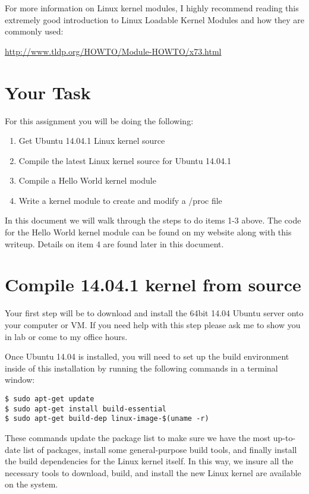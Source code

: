 \documentclass[11pt]{article}
\begin{document}
For more information on Linux kernel modules, I highly recommend reading this extremely good introduction to Linux Loadable Kernel Modules and how they are commonly used:

{\url{http://www.tldp.org/HOWTO/Module-HOWTO/x73.html}}


\section*{Your Task}

For this assignment you will be doing the following:

\begin{enumerate}
\item{Get Ubuntu 14.04.1 Linux kernel source}
\item{Compile the latest Linux kernel source for Ubuntu 14.04.1}
\item{Compile a Hello World kernel module}
\item{Write a kernel module to create and modify a /proc file}
\end{enumerate}

In this document we will walk through the steps to do items 1-3 above. The code for the Hello World kernel module can be found on my website along with this writeup. Details on item 4 are found later in this document. 



\section*{Compile 14.04.1 kernel from source}
Your first step will be to download and install the 64bit 14.04 Ubuntu server \cite{ubuntuserver} onto your computer or VM. If you need help with this step please ask me to show you in lab or come to my office hours.

Once Ubuntu 14.04 is installed, you will need to set up the build environment inside of this installation by running the following commands in a terminal window:

\begin{verbatim}
$ sudo apt-get update
$ sudo apt-get install build-essential
$ sudo apt-get build-dep linux-image-$(uname -r)
\end{verbatim}

These commands update the package list to make sure we have the most up-to-date list of packages, install some general-purpose build tools, and finally install the build dependencies for the Linux kernel itself. In this way, we insure all the necessary tools to download, build, and install the new Linux kernel are available on the system.
\end{document}
